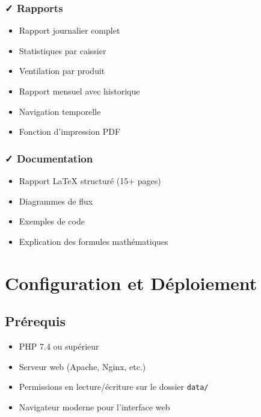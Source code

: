 \documentclass[12pt,a4paper]{report}
\begin{document}
\subsection{✓ Rapports}

\begin{itemize}
    \item[✓] Rapport journalier complet
    \item[✓] Statistiques par caissier
    \item[✓] Ventilation par produit
    \item[✓] Rapport mensuel avec historique
    \item[✓] Navigation temporelle
    \item[✓] Fonction d'impression PDF
\end{itemize}

\subsection{✓ Documentation}

\begin{itemize}
    \item[✓] Rapport LaTeX structuré (15+ pages)
    \item[✓] Diagrammes de flux
    \item[✓] Exemples de code
    \item[✓] Explication des formules mathématiques
\end{itemize}

\pagebreak

\chapter{Configuration et Déploiement}

\section{Prérequis}

\begin{itemize}
    \item PHP 7.4 ou supérieur
    \item Serveur web (Apache, Nginx, etc.)
    \item Permissions en lecture/écriture sur le dossier \texttt{data/}
    \item Navigateur moderne pour l'interface web
\end{itemize}
\end{document}
